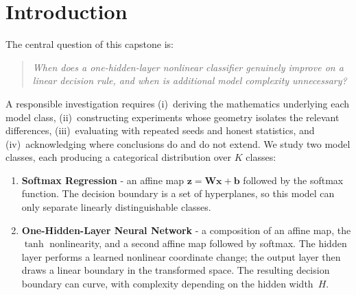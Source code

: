 \documentclass[11pt]{article}
\newcommand{\R}{\mathbb{R}}
\newcommand{\bx}{\mathbf{x}}
\newcommand{\bz}{\mathbf{z}}
\newcommand{\bW}{\mathbf{W}}
\newcommand{\bb}{\mathbf{b}}
\newcommand{\bY}{\mathbf{Y}}
\newcommand{\bP}{\mathbf{P}}
\newcommand{\bZ}{\mathbf{Z}}
\newcommand{\bA}{\mathbf{A}}
\begin{document}

\section{Introduction}

The central question of this capstone is:
\begin{quote}
\itshape When does a one-hidden-layer nonlinear classifier genuinely improve on a linear
decision rule, and when is additional model complexity unnecessary?
\end{quote}

A responsible investigation requires
(i)~deriving the mathematics underlying each model class,
(ii)~constructing experiments whose geometry isolates the relevant differences,
(iii)~evaluating with repeated seeds and honest statistics, and
(iv)~acknowledging where conclusions do and do not extend. We study two model classes, each producing a categorical distribution over $K$ classes:
\begin{enumerate}[label=(\roman*),leftmargin=2em,itemsep=0.15em]
  \item[(a)] \textbf{Softmax Regression} - an affine map $\bz = \bW\bx + \bb$ followed by the
        softmax function.  The decision boundary is a set of hyperplanes, so this model can
        only separate linearly distinguishable classes.
  \item[(b)] \textbf{One-Hidden-Layer Neural Network} - a composition of an affine map, the
        $\tanh$ nonlinearity, and a second affine map followed by softmax.  The hidden layer
        performs a learned nonlinear coordinate change; the output layer then draws a linear
        boundary in the transformed space.  The resulting decision boundary can curve,
        with complexity depending on the hidden width~$H$.
\end{enumerate}
\end{document}
